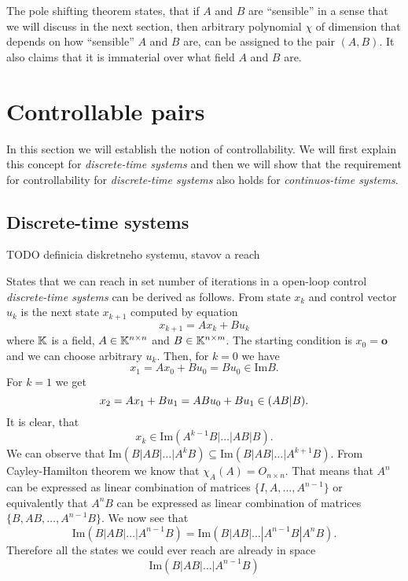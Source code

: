 The pole shifting theorem states, that if $A$ and $B$ are ``sensible'' in a sense that we will discuss in the next section, then arbitrary polynomial $\chi$ of dimension that depends on how ``sensible'' $A$ and $B$ are, can be assigned to the pair $(A,B)$. It also claims that it is immaterial over what field $A$ and $B$ are.

\section{Controllable pairs}

In this section we will establish the notion of controllability. We will first explain this concept for \textit{discrete-time systems} and then we will show that the requirement for controllability for \textit{discrete-time systems} also holds for \textit{continuos-time systems}.

\subsection{Discrete-time systems}

TODO definicia diskretneho systemu, stavov a reach

\begin{definition}
	
\end{definition}

States that we can reach in set number of iterations in a open-loop control \textit{discrete-time systems} can be derived as follows. From state $x_k$ and control vector $u_k$ is the next state $x_{k+1}$ computed by equation $$x_{k+1}=Ax_k+Bu_k$$ where $\mathbb{K}$ is a field, $A\in\mathbb{K}^{n\times n}$ and $B\in\mathbb{K}^{n\times m}$. The starting condition is $x_0=\textbf{o}$ and we can choose arbitrary $u_k$. Then, for $k=0$ we have $$x_1=Ax_0+Bu_0=Bu_0 \in \text{Im}B.$$ For $k=1$ we get $$x_2=Ax_1+Bu_1=ABu_0+Bu_1\in\text(AB|B).$$ It is clear, that $$x_k\in\text{Im}(A^{k-1}B|\ldots|AB|B).$$ We can observe that $\text{Im}(B|AB|\ldots|A^kB) \subseteq \text{Im}(B|AB|\ldots|A^{k+1}B)$. From Cayley-Hamilton theorem we know that $\chi_A(A)=O_{n\times n}$. That means that $A^n$ can be expressed as linear combination of matrices $\{I,A,\ldots,A^{n-1}\}$ or equivalently that $A^nB$ can be expressed as linear combination of matrices $\{B,AB,\ldots,A^{n-1}B\}$. We now see that $$\text{Im}(B|AB|\ldots|A^{n-1}B)=\text{Im}(B|AB|\ldots|A^{n-1}B|A^nB).$$ Therefore all the states we could ever reach are already in space $$\text{Im}(B|AB|\ldots|A^{n-1}B)$$


